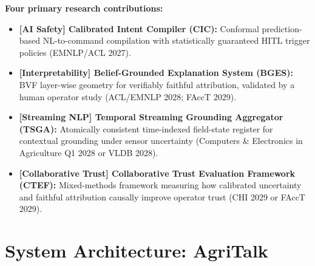 \documentclass[11pt,a4paper]{article}
\begin{document}
\smallskip
\begin{contribbox}
\small\textbf{Four primary research contributions:}\\[-5pt]
\begin{itemize}
\item[\textbf{C1}] \textbf{[AI Safety] Calibrated Intent Compiler (CIC):} Conformal prediction-based NL-to-command compilation with statistically guaranteed HITL trigger policies (EMNLP/ACL 2027).
\item[\textbf{C2}] \textbf{[Interpretability] Belief-Grounded Explanation System (BGES):} BVF layer-wise geometry for verifiably faithful attribution, validated by a human operator study (ACL/EMNLP 2028; FAccT 2029).
\item[\textbf{C3}] \textbf{[Streaming NLP] Temporal Streaming Grounding Aggregator (TSGA):} Atomically consistent time-indexed field-state register for contextual grounding under sensor uncertainty (Computers \& Electronics in Agriculture Q1 2028 or VLDB 2028).
\item[\textbf{C4}] \textbf{[Collaborative Trust] Collaborative Trust Evaluation Framework (CTEF):} Mixed-methods framework measuring how calibrated uncertainty and faithful attribution causally improve operator trust (CHI 2029 or FAccT 2029).
\end{itemize}
\end{contribbox}

\section{System Architecture: AgriTalk}
\end{document}
